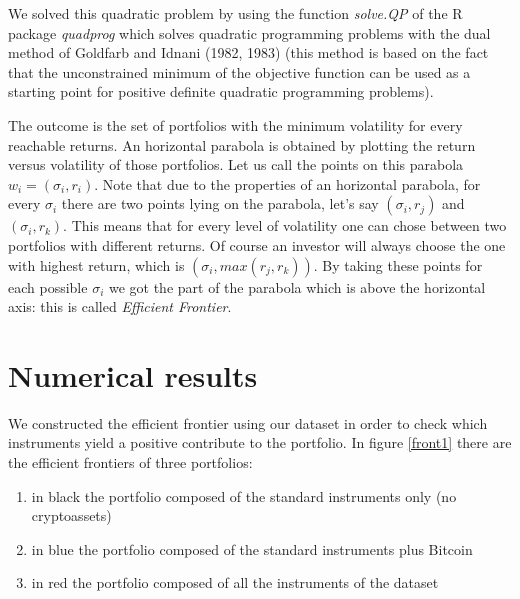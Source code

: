 We solved this quadratic problem by using the function \textit{solve.QP} of the R \citep{R} package \textit{quadprog} \citep{quadp} which solves quadratic programming problems with the dual method of Goldfarb and Idnani (1982, 1983) (this method is based on the fact that the unconstrained minimum of the objective function can be used as a starting point for positive definite quadratic programming problems).

The outcome is the set of portfolios with the minimum volatility for every reachable returns. An horizontal parabola is obtained by plotting the return versus volatility of those portfolios. 
Let us call the points on this parabola $w_i=(\sigma_i,r_i)$. Note that due to the properties of an horizontal parabola, for every $\sigma_i$ there are two points lying on the parabola, let's say $(\sigma_i,r_j)$ and $(\sigma_i,r_k)$. 
This means that for every level of volatility one can chose between two portfolios with different returns. Of course an investor will always choose the one with highest return, which is $(\sigma_i,max(r_j,r_k))$. 
By taking these points for each possible $\sigma_i$ we got the part of the parabola which is above the horizontal axis: this is called \textit{Efficient Frontier}.


\section{Numerical results}
\label{Numerical results}

We constructed the efficient frontier using our dataset in order to check which instruments yield a positive contribute to the portfolio.
In figure \ref{front1} there are the efficient frontiers of three portfolios:
\begin{enumerate}
    \item in black the portfolio composed of the standard instruments only (no cryptoassets)
    \item in blue the portfolio composed of the standard instruments plus Bitcoin
    \item in red the portfolio composed of all the instruments of the dataset
\end{enumerate}

